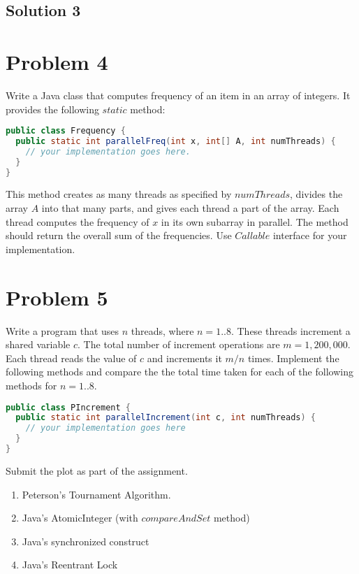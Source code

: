 \documentclass{article}
\begin{document}
\subsection{Solution 3}


\pagebreak
\section{Problem 4}
Write a Java class that computes frequency of an item in an array of integers. It provides the following $static$ method:

\begin{lstlisting}[language=Java]
public class Frequency {
  public static int parallelFreq(int x, int[] A, int numThreads) {
    // your implementation goes here.
  }
}
\end{lstlisting}

This method creates as many threads as specified by $numThreads$, divides the array $A$ into that many parts, and gives each thread a part of the array. Each thread computes the frequency of $x$ in its own subarray in parallel. The method should return the overall sum of the frequencies. Use $Callable$ interface for your implementation.

\pagebreak
\section{Problem 5}
Write a program that uses $n$ threads, where $n = 1..8$. These threads increment a shared variable $c$. The total number of increment operations are $m = 1, 200, 000$. Each thread reads the value of $c$ and increments it $m/n$ times. Implement the following methods and compare the the total time taken for each of
the following methods for $n = 1..8$.

\begin{lstlisting}[language=Java]
public class PIncrement {
  public static int parallelIncrement(int c, int numThreads) {
    // your implementation goes here
  }
}
\end{lstlisting}


Submit the plot as part of the assignment.

\begin{enumerate}[label=\alph*)]
  \item Peterson’s Tournament Algorithm.
  \item Java’s AtomicInteger (with $compareAndSet$ method)
  \item Java’s synchronized construct
  \item Java’s Reentrant Lock
\end{enumerate}
\end{document}
